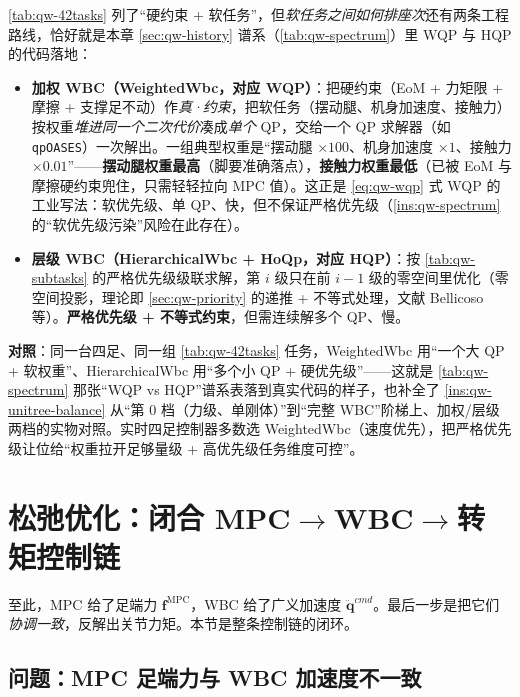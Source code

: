 \begin{insight}\label{ins:qw-weighted-vs-hierarchical}
\cref{tab:qw-42tasks} 列了“硬约束 + 软任务”，但\emph{软任务之间如何排座次}还有两条工程路线，恰好就是本章 \cref{sec:qw-history} 谱系（\cref{tab:qw-spectrum}）里 WQP 与 HQP 的代码落地：
\begin{itemize}
  \item \textbf{加权 WBC（WeightedWbc，对应 WQP）}：把硬约束（EoM + 力矩限 + 摩擦 + 支撑足不动）作\emph{真·约束}，把软任务（摆动腿、机身加速度、接触力）按权重\emph{堆进同一个二次代价}凑成\emph{单个} QP，交给一个 QP 求解器（如 \texttt{qpOASES}）一次解出。一组典型权重是“摆动腿 $\times100$、机身加速度 $\times1$、接触力 $\times0.01$”——\textbf{摆动腿权重最高}（脚要准确落点），\textbf{接触力权重最低}（已被 EoM 与摩擦硬约束兜住，只需轻轻拉向 MPC 值）。这正是 \cref{eq:qw-wqp} 式 WQP 的工业写法：软优先级、单 QP、快，但不保证严格优先级（\cref{ins:qw-spectrum} 的“软优先级污染”风险在此存在）。
  \item \textbf{层级 WBC（HierarchicalWbc + HoQp，对应 HQP）}：按 \cref{tab:qw-subtasks} 的严格优先级级联求解，第 $i$ 级只在前 $i-1$ 级的零空间里优化（零空间投影，理论即 \cref{sec:qw-priority} 的递推 + 不等式处理，文献 Bellicoso 等\cite{bellicoso2016whole}）。\textbf{严格优先级 + 不等式约束}，但需连续解多个 QP、慢。
\end{itemize}
\textbf{对照}：同一台四足、同一组 \cref{tab:qw-42tasks} 任务，WeightedWbc 用“一个大 QP + 软权重”、HierarchicalWbc 用“多个小 QP + 硬优先级”——这就是 \cref{tab:qw-spectrum} 那张“WQP vs HQP”谱系表落到真实代码的样子，也补全了 \cref{ins:qw-unitree-balance} 从“第 $0$ 档（力级、单刚体）”到“完整 WBC”阶梯上、加权/层级两档的实物对照。实时四足控制器多数选 WeightedWbc（速度优先），把严格优先级让位给“权重拉开足够量级 + 高优先级任务维度可控”。
\end{insight}

\section{松弛优化：闭合 MPC$\to$WBC$\to$转矩控制链}
\label{sec:qw-relax}

至此，MPC 给了足端力 $\boldsymbol{f}^{\mathrm{MPC}}$，WBC 给了广义加速度 $\ddot{\boldsymbol{q}}^{cmd}$。最后一步是把它们\emph{协调一致}，反解出关节力矩。本节是整条控制链的闭环。

\subsection{问题：MPC 足端力与 WBC 加速度不一致}
\label{subsec:qw-inconsistency}

